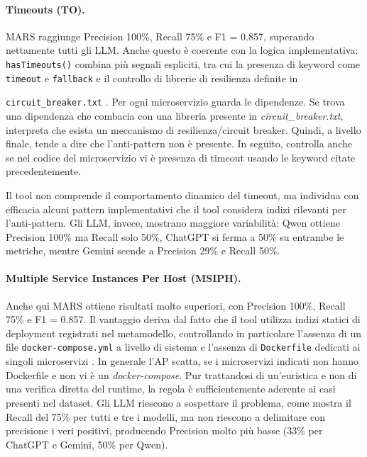 \paragraph{Timeouts (TO).}
MARS raggiunge Precision 100\%, Recall 75\% e F1 = 0.857, superando nettamente tutti gli LLM. Anche questo è coerente con la logica implementativa: \texttt{hasTimeouts()} combina più segnali espliciti, tra cui la presenza di keyword come \texttt{timeout} e \texttt{fallback} e il controllo di librerie di resilienza definite in 

\texttt{circuit\_breaker.txt} \cite{MARS, madern2024_mars}. Per ogni microservizio guarda le dipendenze. Se trova una dipendenza che combacia con una libreria presente in \textit{circuit\_breaker.txt}, interpreta che esista un meccanismo di resilienza/circuit breaker. Quindi, a livello finale, tende a dire che l’anti-pattern non è presente. In seguito, controlla anche se nel codice del microservizio vi è presenza di timeout usando le keyword citate precedentemente.

Il tool non comprende il comportamento dinamico del timeout, ma individua con efficacia alcuni pattern implementativi che il tool considera indizi rilevanti per l'anti-pattern. Gli LLM, invece, mostrano maggiore variabilità: Qwen ottiene Precision 100\% ma Recall solo 50\%, ChatGPT si ferma a 50\% su entrambe le metriche, mentre Gemini scende a Precision 29\% e Recall 50\%.

\paragraph{Multiple Service Instances Per Host (MSIPH).}
Anche qui MARS ottiene risultati molto superiori, con Precision 100\%, Recall 75\% e F1 = 0.857. Il vantaggio deriva dal fatto che il tool utilizza indizi statici di deployment registrati nel metamodello, controllando in particolare l'assenza di un file \texttt{docker-compose.yml} a livello di sistema e l'assenza di \texttt{Dockerfile} dedicati ai singoli microservizi \cite{MARS, madern2024_mars}. In generale l'AP scatta, se i microservizi indicati non hanno Dockerfile e non vi è un \textit{docker-compose}. Pur trattandosi di un’euristica e non di una verifica diretta del runtime, la regola è sufficientemente aderente ai casi presenti nel dataset. Gli LLM riescono a sospettare il problema, come mostra il Recall del 75\% per tutti e tre i modelli, ma non riescono a delimitare con precisione i veri positivi, producendo Precision molto più basse (33\% per ChatGPT e Gemini, 50\% per Qwen).

